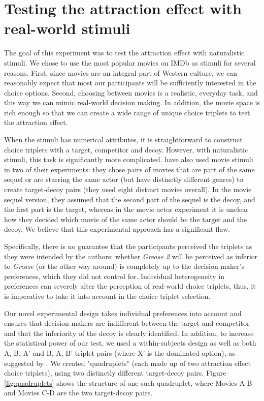 \documentclass[12pt, a4paper]{article}
\begin{document}
\section{Testing the attraction effect with real-world stimuli}

The goal of this experiment was to test the attraction effect with naturalistic stimuli. We chose to use the most popular movies on IMDb as stimuli for several reasons. First, since movies are an integral part of Western culture, we can reasonably expect that most our participants will be sufficiently interested in the choice options. Second, choosing between movies is a realistic, everyday task, and this way we can mimic real-world decision making. In addition, the movie space is rich enough so that we can create a wide range of unique choice triplets to test the attraction effect.

When the stimuli has numerical attributes, it is straightforward to construct choice triplets with a target, competitor and decoy. However, with naturalistic stimuli, this task is significantly more complicated. \citeauthor{Frederick2014} have also used movie stimuli in two of their experiments: they chose pairs of movies that are part of the same sequel or are starring the same actor (but have distinctly different genres) to create target-decoy pairs (they used eight distinct movies overall). In the movie sequel version, they assumed that the second part of the sequel is the decoy, and the first part is the target, whereas in the movie actor experiment it is unclear how they decided which movie of the same actor should be the target and the decoy. We believe that this experimental approach has a significant flaw.

Specifically, there is no guarantee that the participants perceived the triplets as they were intended by the authors: whether \textit{Grease 2} will be perceived as inferior to \textit{Grease} (or the other way around) is completely up to the decision maker's preferences, which they did not control for. Individual heterogeneity in preferences can severely alter the perception of real-world choice triplets, thus, it is imperative to take it into account in the choice triplet selection.

Our novel experimental design takes individual preferences into account and ensures that decision makers are indifferent between the target and competitor and that the inferiority of the decoy is clearly identified. In addition, to increase the statistical power of our test, we used a within-subjects design as well as both A, B, A' and B, A, B' triplet pairs (where X' is the dominated option), as suggested by . We created "quadruplets" (each made up of two attraction effect choice triplets), using two distinctly different target-decoy pairs. Figure \ref{fig:quadruplets} shows the structure of one such quadruplet, where Movies A-B and Movies C-D are the two target-decoy pairs.
\end{document}

